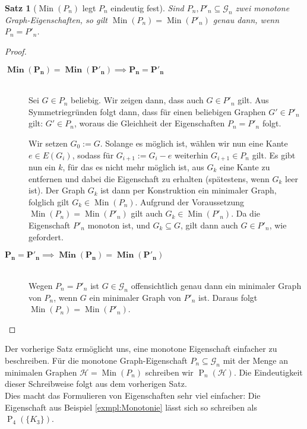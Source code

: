 \documentclass[10pt,a4paper, footheight=1mm, bibliography=totoc]{scrreprt}
\newtheorem{Satz}[definition]{Satz}
\theoremstyle{definition}
\DeclareMathOperator\Min{Min}
\begin{document}
\begin{Satz}[$\Min(P_n)$ legt $P_n$ eindeutig fest]
Sind $P_n, P'_n \subseteq \mathcal{G}_n$ zwei monotone 
Graph-Eigenschaften, so gilt
$\Min(P_n) = \Min(P'_n)$ genau dann, wenn $P_n = P'_n$.
\end{Satz}
\begin{proof} \hfill
\vspace*{-3mm}
\begin{description}
\item[$\boldsymbol{\Min(P_n) = \Min(P'_n) \implies P_n = P'_n}$]
\hfill \\
Sei $G \in P_n$ beliebig. Wir zeigen dann, dass auch $G \in P'_n$
gilt. Aus Symmetriegründen folgt dann, dass für einen  beliebigen
Graphen $G' \in P'_n$ gilt: $G' \in P_n$, woraus die Gleichheit der
Eigenschaften $P_n = P'_n$ folgt.

Wir setzen $G_0 := G$. Solange es möglich ist, wählen wir nun
eine Kante $e \in E(G_i)$, sodass für $G_{i+1} := G_i - e$  
weiterhin $G_{i+1} \in P_n$ gilt.
Es gibt nun ein $k$, für das es nicht mehr möglich ist,
aus $G_k$ eine Kante zu entfernen und dabei die Eigenschaft
zu erhalten (spätestens, wenn $G_k$ leer ist).
Der Graph $G_k$ ist dann per Konstruktion ein minimaler
Graph, folglich gilt $G_k \in \Min(P_n)$. Aufgrund der
Voraussetzung $\Min(P_n) = \Min(P'_n)$ gilt auch 
$G_k \in \Min(P'_n)$. Da die Eigenschaft $P'_n$ monoton ist,
und $G_k \subseteq G$, gilt dann auch $G \in P'_n$,
wie gefordert.
\vspace*{-2mm}
\item[$\boldsymbol{P_n = P'_n \implies \Min(P_n) = \Min(P'_n)}$]
\hfill \\
Wegen $P_n = P'_n$ ist $G \in \mathcal{G}_n$ offensichtlich
genau dann ein minimaler Graph von $P_n$, wenn $G$ ein 
minimaler Graph von $P'_n$ ist. Daraus folgt 
$\Min(P_n) = \Min(P'_n)$. \qedhere
\end{description}
\end{proof}
Der vorherige Satz ermöglicht uns, eine
monotone Eigenschaft einfacher zu beschreiben. 
Für die monotone Graph-Eigenschaft $P_n\subseteq \mathcal{G}_n$
mit der Menge an minimalen Graphen $\mathcal{H} = \Min(P_n)$
schreiben wir $\operatorname{P}_n(\mathcal{H})$. Die Eindeutigkeit dieser
Schreibweise folgt aus dem vorherigen Satz. \\
Dies macht das Formulieren von Eigenschaften sehr viel einfacher:
Die Eigenschaft aus Beispiel \ref{exmpl:Monotonie} lässt sich
so schreiben als $\operatorname{P}_4(\{K_3\})$.
\end{document}
